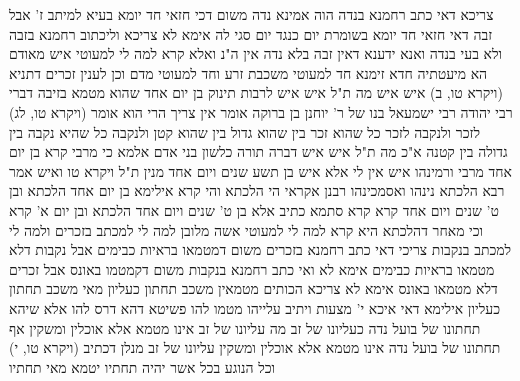 \documentclass[12pt, openany]{book}
\begin{document}
{צריכא דאי כתב רחמנא בנדה הוה אמינא נדה משום דכי חזאי חד יומא בעיא למיתב ז' אבל זבה דאי חזאי חד יומא בשומרת יום כנגד יום סגי לה אימא לא צריכא 
וליכתוב רחמנא בזבה ולא בעי בנדה ואנא ידענא דאין זבה בלא נדה אין ה"נ ואלא קרא למה לי למעוטי איש מאודם 
הא מיעטתיה חדא זימנא חד למעוטי משכבת זרע וחד למעוטי מדם 
וכן לענין זכרים דתניא (ויקרא טו, ב) איש איש מה ת"ל איש איש לרבות תינוק בן יום אחד שהוא מטמא בזיבה דברי רבי יהודה 
רבי ישמעאל בנו של ר' יוחנן בן ברוקה אומר אין צריך הרי הוא אומר (ויקרא טו, לג) לזכר ולנקבה לזכר כל שהוא זכר בין שהוא גדול בין שהוא קטן ולנקבה כל שהיא נקבה בין גדולה בין קטנה א"כ מה ת"ל איש איש דברה תורה כלשון בני אדם 
אלמא כי מרבי קרא בן יום אחד מרבי ורמינהו איש אין לי אלא איש בן תשע שנים ויום אחד מנין ת"ל {ויקרא טו } ואיש 
אמר רבא הלכתא נינהו ואסמכינהו רבנן אקראי הי הלכתא והי קרא אילימא בן יום אחד הלכתא ובן ט' שנים ויום אחד קרא קרא סתמא כתיב 
אלא בן ט' שנים ויום אחד הלכתא ובן יום א' קרא וכי מאחר דהלכתא היא קרא למה לי למעוטי אשה מלובן
למה לי למכתב בזכרים ולמה לי למכתב בנקבות
צריכי דאי כתב רחמנא בזכרים משום דמטמאו בראיות כבימים אבל נקבות דלא מטמאו בראיות כבימים אימא לא 
ואי כתב רחמנא בנקבות משום דקמטמו באונס אבל זכרים דלא מטמאו באונס אימא לא צריכא
הכותים מטמאין משכב תחתון כעליון מאי משכב תחתון כעליון אילימא דאי איכא י' מצעות ויתיב עלייהו מטמו להו פשיטא דהא דרס להו 
אלא שיהא תחתונו של בועל נדה כעליונו של זב מה עליונו של זב אינו מטמא אלא אוכלין ומשקין אף תחתונו של בועל נדה אינו מטמא אלא אוכלין ומשקין 
עליונו של זב מנלן דכתיב (ויקרא טו, י) וכל הנוגע בכל אשר יהיה תחתיו יטמא מאי תחתיו}
\end{document}

